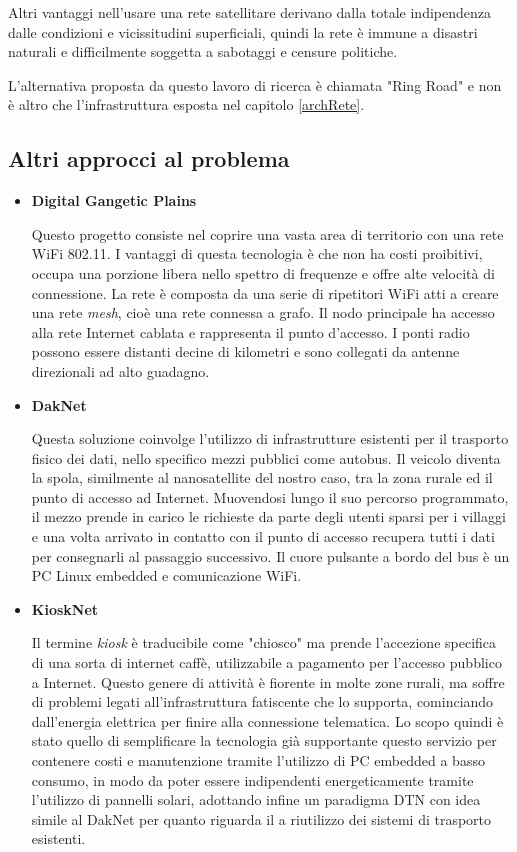 \documentclass[12pt,a4paper,oneside]{book}
\begin{document}
			Altri vantaggi nell'usare una rete satellitare derivano dalla totale indipendenza dalle condizioni e vicissitudini superficiali, quindi la rete è immune a disastri naturali e difficilmente soggetta a sabotaggi e censure politiche.
			
			L'alternativa proposta da questo lavoro di ricerca è chiamata "Ring Road" \cite{burleigh2011toward} e non è altro che l'infrastruttura esposta nel capitolo \ref{archRete}.
				
			\subsection{Altri approcci al problema}
			
			\begin{itemize}
				\item {\bf Digital Gangetic Plains \cite{raman2007experiences}}
				
				Questo progetto consiste nel coprire una vasta area di territorio con una rete WiFi 802.11. I vantaggi di questa tecnologia è che non ha costi proibitivi, occupa una porzione libera nello spettro di frequenze e offre alte velocità di connessione. La rete è composta da una serie di ripetitori WiFi atti a creare una rete {\it mesh}, cioè una rete connessa a grafo. Il nodo principale ha accesso alla rete Internet cablata e rappresenta il punto d'accesso. I ponti radio possono essere distanti decine di kilometri e sono collegati da antenne direzionali ad alto guadagno. 
				
				\item {\bf DakNet \cite{hasson2003daknet}}
				
				Questa soluzione coinvolge l'utilizzo di infrastrutture esistenti per il trasporto fisico dei dati, nello specifico mezzi pubblici come autobus. Il veicolo diventa la spola, similmente al nanosatellite del nostro caso, tra la zona rurale ed il punto di accesso ad Internet. Muovendosi lungo il suo percorso programmato, il mezzo prende in carico le richieste da parte degli utenti sparsi per i villaggi e una volta arrivato in contatto con il punto di accesso recupera tutti i dati per consegnarli al passaggio successivo. Il cuore pulsante a bordo del bus è un PC Linux embedded e comunicazione WiFi. 
				
				\item {\bf KioskNet \cite{seth2006low}}
				
				Il termine {\it kiosk} è traducibile come "chiosco" ma prende l'accezione specifica di una sorta di internet caffè, utilizzabile a pagamento per l'accesso pubblico a Internet. Questo genere di attività è fiorente in molte zone rurali, ma soffre di problemi legati all'infrastruttura fatiscente che lo supporta, cominciando dall'energia elettrica per finire alla connessione telematica. Lo scopo quindi è stato quello di semplificare la tecnologia già supportante questo servizio per contenere costi e manutenzione tramite l'utilizzo di PC embedded a basso consumo, in modo da poter essere indipendenti energeticamente tramite l'utilizzo di pannelli solari, adottando infine un paradigma DTN con idea simile al DakNet per quanto riguarda il a riutilizzo dei sistemi di trasporto esistenti.
								

\end{itemize}
\end{document}

